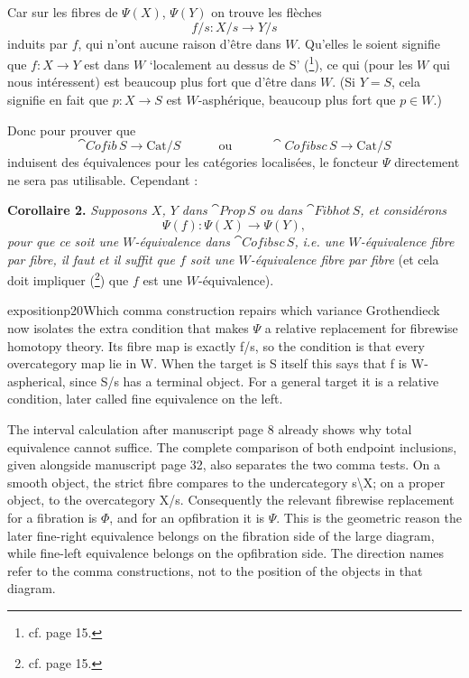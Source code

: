 Car sur les fibres de $\Psi(X)$, $\Psi(Y)$ on trouve les flèches
\[
f/s : X/s \longrightarrow Y/s
\]
induits par $f$, qui n'ont aucune raison d'être dans $W$. Qu'elles le soient signifie que $f : X \longrightarrow Y$ est dans $W$ `localement au dessus de S' (\footnote[11]{cf.  page 15.}), ce qui (pour les $W$ qui nous intéressent) est beaucoup plus fort que d'être dans $W$. (Si $Y = S$, cela signifie en fait que $p : X \longrightarrow S$ est $W$-asphérique, beaucoup plus fort que $p \in W$.)

Donc pour prouver que
\[
\cat{Cofib}\,S \longrightarrow \mathrm{Cat}/S \qquad\quad \text{ou} \qquad\quad \cat{Cofibsc}\,S \longrightarrow \mathrm{Cat}/S
\]
induisent des équivalences pour les catégories localisées, le foncteur $\Psi$ directement ne sera pas utilisable. Cependant :

\textbf{Corollaire 2.} \textit{Supposons $X$, $Y$ dans} $\cat{Prop}\,S$ \textit{ou dans} $\cat{Fibhot}\,S$\textit{, et considérons}
\[
\Psi(f) : \Psi(X) \longrightarrow \Psi(Y),
\]
\textit{pour que ce soit une $W$-équivalence dans} $\cat{Cofibsc}\,S$\textit{,}
\textit{i.e. une $W$-équivalence fibre par fibre, il faut et il suffit que $f$ soit une $W$-équivalence fibre par fibre} (et cela doit impliquer (\footnote[12]{cf.  page 15.}) que $f$ est une $W$-équivalence).

\begin{dcomment}{exposition}{p20}{Which comma construction repairs which variance}
Grothendieck now isolates the extra condition that makes \ensuremath{\Psi} a relative replacement for fibrewise homotopy theory. Its fibre map is exactly f/s, so the condition is that every overcategory map lie in W. When the target is S itself this says that f is W-aspherical, since S/s has a terminal object. For a general target it is a relative condition, later called fine equivalence on the left.

The interval calculation after manuscript page 8 already shows why total equivalence cannot suffice. The complete comparison of both endpoint inclusions, given alongside manuscript page 32, also separates the two comma tests. On a smooth object, the strict fibre compares to the undercategory s\textbackslash{}X; on a proper object, to the overcategory X/s. Consequently the relevant fibrewise replacement for a fibration is \ensuremath{\Phi}, and for an opfibration it is \ensuremath{\Psi}. This is the geometric reason the later fine-right equivalence belongs on the fibration side of the large diagram, while fine-left equivalence belongs on the opfibration side. The direction names refer to the comma constructions, not to the position of the objects in that diagram.

\end{dcomment}


